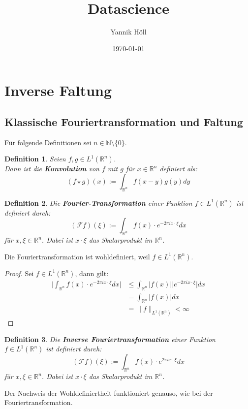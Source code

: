 \documentclass{article}
\title{Datascience}
\author{Yannik Höll}
\date{\today}
\newcommand{\R}[0]{\mathbb{R}}
\newtheorem{defin}{Definition}
\begin{document}
\maketitle

\section{Inverse Faltung}

\subsection{Klassische Fouriertransformation und Faltung}

Für folgende Definitionen sei $n \in \mathbb{N} \setminus \{ 0 \}$.

\begin{defin}
    Seien $f,g \in L^1(\R^n)$. \\
    Dann ist die \textbf{Konvolution} von $f$ mit $g$ für $x \in \R^n$ definiert als:
    \begin{equation}
        (f \star g)(x) := \int_{\R^n} f(x - y) g(y) dy
    \end{equation}
\end{defin}

\begin{defin} Die \textbf{Fourier-Transformation} einer Funktion $f \in L^1(\R^n)$ ist definiert durch:
    \begin{equation}
        (\mathcal{F}f)(\xi) := \int_{\R^n} f(x) \cdot e^{-2\pi i x \cdot \xi} dx
    \end{equation}
    für $x, \xi \in \R^n$. Dabei ist $x \cdot \xi$ das Skalarprodukt im $\R^n$.
\end{defin}

Die Fouriertransformation ist wohldefiniert, weil $f \in L^1(\R^n)$.
\begin{proof}
    Sei $f \in L^1(\R^n)$, dann gilt:
    \begin{align*}
        \Bigg\lvert \int_{\R^n} f(x) \cdot e^{-2\pi i x \cdot \xi} dx \Bigg\rvert &\leq \int_{\R^n} \lvert f(x) \rvert \lvert e^{-2\pi i x \cdot \xi} \rvert dx \\
        &= \int_{\R^n} \lvert f(x) \rvert dx \\
        &= \lVert f \rVert_{L^1(\R^n)} < \infty
    \end{align*}
\end{proof}

\begin{defin}
    Die \textbf{Inverse Fouriertransformation} einer Funktion $f \in L^1(\R^n)$ ist definiert durch:
    \begin{equation}
        (\mathcal{F}f)(\xi) := \int_{\R^n} f(x) \cdot e^{2\pi i x \cdot \xi} dx
    \end{equation}
    für $x, \xi \in \R^n$. Dabei ist $x \cdot \xi$ das Skalarprodukt im $\R^n$.
\end{defin}
Der Nachweis der Wohldefiniertheit funktioniert genauso, wie bei der Fouriertransformation.
\end{document}
